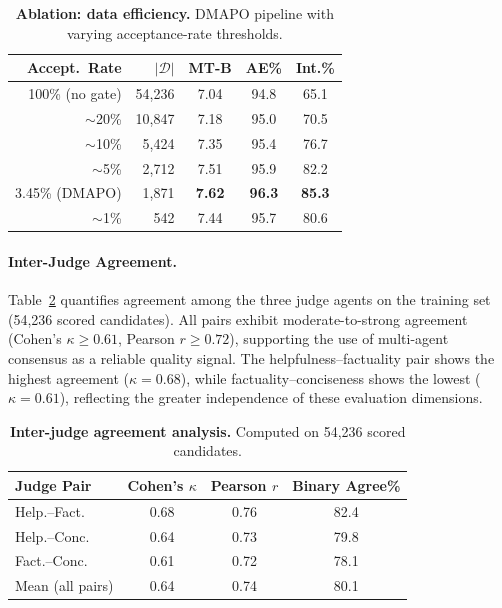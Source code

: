 \documentclass[10pt,twocolumn]{article}
\newcommand{\ours}{\textsc{DMAPO}}
\newcommand{\best}[1]{\textbf{#1}}
\begin{document}
\begin{table}[t]
\centering
\caption{\textbf{Ablation: data efficiency.}
\ours{} pipeline with varying acceptance-rate thresholds.}
\label{tab:ablation_efficiency}
\vspace{0.5em}
\begin{tabular}{r r ccc}
\toprule
\textbf{Accept.\ Rate} & $|\mathcal{D}|$ & \textbf{MT-B} & \textbf{AE\%} & \textbf{Int.\%} \\
\midrule
100\% (no gate)          & 54{,}236 & 7.04 & 94.8 & 65.1 \\
$\sim$20\%               & 10{,}847 & 7.18 & 95.0 & 70.5 \\
$\sim$10\%               &  5{,}424 & 7.35 & 95.4 & 76.7 \\
$\sim$5\%                &  2{,}712 & 7.51 & 95.9 & 82.2 \\
3.45\% (\ours{})         &  1{,}871 & \best{7.62} & \best{96.3} & \best{85.3} \\
$\sim$1\%                &    542  & 7.44 & 95.7 & 80.6 \\
\bottomrule
\end{tabular}
\end{table}



\paragraph{Inter-Judge Agreement.}
Table~\ref{tab:judge_agreement} quantifies agreement among the three judge agents on the training set (54{,}236 scored candidates).
All pairs exhibit moderate-to-strong agreement (Cohen's $\kappa \geq 0.61$, Pearson $r \geq 0.72$), supporting the use of multi-agent consensus as a reliable quality signal.
The helpfulness--factuality pair shows the highest agreement ($\kappa = 0.68$), while factuality--conciseness shows the lowest ($\kappa = 0.61$), reflecting the greater independence of these evaluation dimensions.

\begin{table}[t]
\centering
\caption{\textbf{Inter-judge agreement analysis.}
Computed on 54{,}236 scored candidates.}
\label{tab:judge_agreement}
\vspace{0.5em}
\begin{tabular}{l ccc}
\toprule
\textbf{Judge Pair} & \textbf{Cohen's $\kappa$} & \textbf{Pearson $r$} & \textbf{Binary Agree\%} \\
\midrule
Help.--Fact.      & 0.68 & 0.76 & 82.4 \\
Help.--Conc.      & 0.64 & 0.73 & 79.8 \\
Fact.--Conc.      & 0.61 & 0.72 & 78.1 \\
\midrule
Mean (all pairs)  & 0.64 & 0.74 & 80.1 \\
\bottomrule
\end{tabular}
\end{table}
\end{document}

